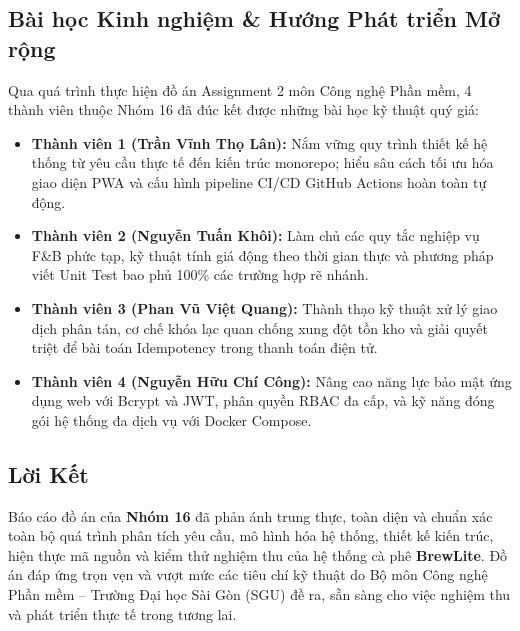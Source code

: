 \documentclass[a4paper]{article}
\begin{document}
\subsection{Bài học Kinh nghiệm \& Hướng Phát triển Mở rộng}
Qua quá trình thực hiện đồ án Assignment 2 môn Công nghệ Phần mềm, 4 thành viên thuộc Nhóm 16 đã đúc kết được những bài học kỹ thuật quý giá:
\begin{itemize}
    \item \textbf{Thành viên 1 (Trần Vĩnh Thọ Lân):} Nắm vững quy trình thiết kế hệ thống từ yêu cầu thực tế đến kiến trúc monorepo; hiểu sâu cách tối ưu hóa giao diện PWA và cấu hình pipeline CI/CD GitHub Actions hoàn toàn tự động.
    \item \textbf{Thành viên 2 (Nguyễn Tuấn Khôi):} Làm chủ các quy tắc nghiệp vụ F\&B phức tạp, kỹ thuật tính giá động theo thời gian thực và phương pháp viết Unit Test bao phủ 100\% các trường hợp rẽ nhánh.
    \item \textbf{Thành viên 3 (Phan Vũ Việt Quang):} Thành thạo kỹ thuật xử lý giao dịch phân tán, cơ chế khóa lạc quan chống xung đột tồn kho và giải quyết triệt để bài toán Idempotency trong thanh toán điện tử.
    \item \textbf{Thành viên 4 (Nguyễn Hữu Chí Công):} Nâng cao năng lực bảo mật ứng dụng web với Bcrypt và JWT, phân quyền RBAC đa cấp, và kỹ năng đóng gói hệ thống đa dịch vụ với Docker Compose.
\end{itemize}

\subsection{Lời Kết}
Báo cáo đồ án của \textbf{Nhóm 16} đã phản ánh trung thực, toàn diện và chuẩn xác toàn bộ quá trình phân tích yêu cầu, mô hình hóa hệ thống, thiết kế kiến trúc, hiện thực mã nguồn và kiểm thử nghiệm thu của hệ thống cà phê \textbf{BrewLite}. Đồ án đáp ứng trọn vẹn và vượt mức các tiêu chí kỹ thuật do Bộ môn Công nghệ Phần mềm -- Trường Đại học Sài Gòn (SGU) đề ra, sẵn sàng cho việc nghiệm thu và phát triển thực tế trong tương lai.
\end{document}

